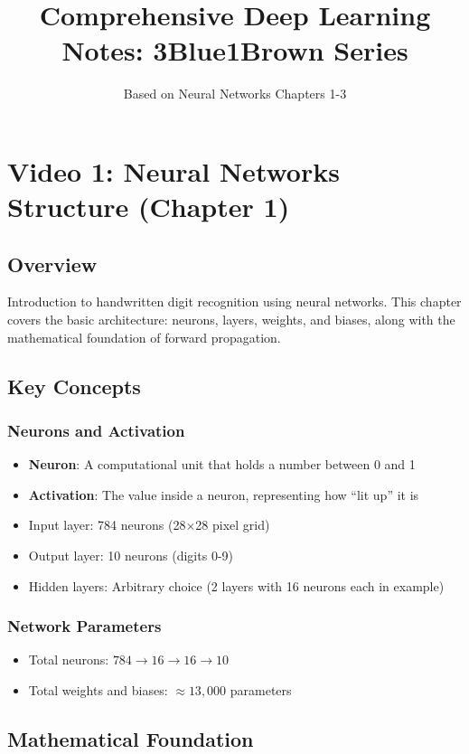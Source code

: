 \documentclass[11pt,a4paper]{article}
\title{Comprehensive Deep Learning Notes: 3Blue1Brown Series}
\author{Based on Neural Networks Chapters 1-3}
\date{}
\begin{document}
\maketitle

\section{Video 1: Neural Networks Structure (Chapter 1)}

\subsection{Overview}
Introduction to handwritten digit recognition using neural networks. This chapter covers the basic architecture: neurons, layers, weights, and biases, along with the mathematical foundation of forward propagation.

\subsection{Key Concepts}

\subsubsection{Neurons and Activation}
\begin{itemize}
    \item \textbf{Neuron}: A computational unit that holds a number between 0 and 1
    \item \textbf{Activation}: The value inside a neuron, representing how ``lit up'' it is
    \item Input layer: 784 neurons (28×28 pixel grid)
    \item Output layer: 10 neurons (digits 0-9)
    \item Hidden layers: Arbitrary choice (2 layers with 16 neurons each in example)
\end{itemize}

\subsubsection{Network Parameters}
\begin{itemize}
    \item Total neurons: $784 \to 16 \to 16 \to 10$
    \item Total weights and biases: $\approx 13,000$ parameters
\end{itemize}

\subsection{Mathematical Foundation}
\end{document}
